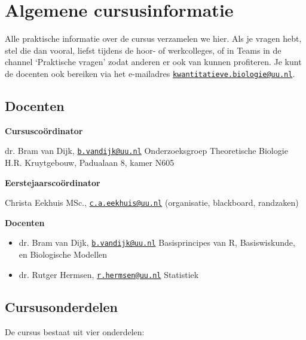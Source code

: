 \documentclass[
  a4paper,
]{scrbook}
\providecommand{\tightlist}{%
  \setlength{\itemsep}{0pt}\setlength{\parskip}{0pt}}\usepackage{longtable,booktabs,array}
\theoremstyle{definition}
\theoremstyle{remark}
\begin{document}
\chapter{Algemene cursusinformatie}\label{algemene-cursusinformatie}

Alle praktische informatie over de cursus verzamelen we hier. Als je
vragen hebt, stel die dan vooral, liefst tijdens de hoor- of
werkcolleges, of in Teams in de channel `Praktische vragen' zodat
anderen er ook van kunnen profiteren. Je kunt de docenten ook bereiken
via het e-mailadres
\href{mailto:kwantitatieve.biologie@uu.nl}{\nolinkurl{kwantitatieve.biologie@uu.nl}}.

\section{Docenten}\label{docenten}

\textbf{Cursuscoördinator}

dr. Bram van Dijk,
\href{mailto:b.vandijk@uu.nl}{\nolinkurl{b.vandijk@uu.nl}}
Onderzoeksgroep Theoretische Biologie H.R. Kruytgebouw, Padualaan 8,
kamer N605

\textbf{Eerstejaarscoördinator}

Christa Eekhuis MSc.,
\href{mailto:c.a.eekhuis@uu.nl}{\nolinkurl{c.a.eekhuis@uu.nl}}
(organisatie, blackboard, randzaken)

\textbf{Docenten}

\begin{itemize}
\tightlist
\item
  dr. Bram van Dijk,
  \href{mailto:b.vandijk@uu.nl}{\nolinkurl{b.vandijk@uu.nl}}
  Basisprincipes van R, Basiswiskunde, en Biologische Modellen
\item
  dr. Rutger Hermsen,
  \href{mailto:r.hermsen@uu.nl}{\nolinkurl{r.hermsen@uu.nl}} Statistiek
\end{itemize}

\section{Cursusonderdelen}\label{sec-onderdelen}

De cursus bestaat uit vier onderdelen:
\end{document}
